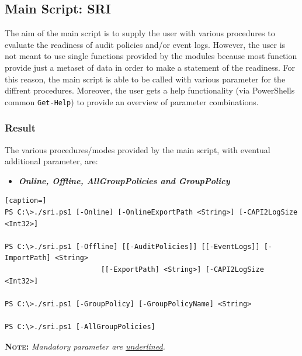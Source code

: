 \clearpage

\subsection{Main Script: SRI}
The aim of the main script is to supply the user with various procedures to evaluate the readiness of audit policies and/or event logs. However, the user is not meant to use single functions provided by the modules because most function provide just a metaset of data in order to make a statement of the readiness. For this reason, the main script is able to be called with various parameter for the diffrent procedures. Moreover, the user gets a help functionality (via PowerShells common \lstinline|Get-Help|) to provide an overview of parameter combinations.
\subsubsection{Result}
The various procedures/modes provided by the main script, with eventual additional parameter, are:
\begin{itemize}
    \item \textbf{\textit{Online, Offline, AllGroupPolicies and GroupPolicy}}
\end{itemize}
\begin{lstlisting}[caption=]
PS C:\>./sri.ps1 [-Online] [-OnlineExportPath <String>] [-CAPI2LogSize <Int32>]

PS C:\>./sri.ps1 [-Offline] [[-AuditPolicies]] [[-EventLogs]] [-ImportPath] <String> 
                       [[-ExportPath] <String>] [-CAPI2LogSize <Int32>]

PS C:\>./sri.ps1 [-GroupPolicy] [-GroupPolicyName] <String>

PS C:\>./sri.ps1 [-AllGroupPolicies]
\end{lstlisting}
\vspace{0.5cm}
\textsc{\textbf{Note:}}\textit{ Mandatory parameter are \underline{underlined}.}
\vspace{0.5cm}
